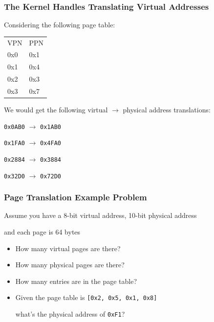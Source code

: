   \begin{frame}
    \frametitle{The Kernel Handles Translating Virtual Addresses}

    Considering the following page table:

    \begin{center}
    {\ttfamily
    \begin{tabular}{ll}
      VPN  & PPN  \\
      0x0 & 0x1 \\
      0x1 & 0x4 \\
      0x2 & 0x3 \\
      0x3 & 0x7 \\
    \end{tabular}}
    \end{center}

    We would get the following virtual $\rightarrow$ physical address translations:

    \begin{center}
    \texttt{0x0AB0} $\rightarrow$ \texttt{0x1AB0}
    
    \texttt{0x1FA0} $\rightarrow$ \texttt{0x4FA0}

    \texttt{0x2884} $\rightarrow$ \texttt{0x3884}

    \texttt{0x32D0} $\rightarrow$ \texttt{0x72D0}
    \end{center}
  \end{frame}

  \begin{frame}
    \frametitle{Page Translation Example Problem}

    Assume you have a 8-bit virtual address, 10-bit physical address

    \hspace{2em} and each page is 64 bytes

    \begin{itemize}
      \item How many virtual pages are there? 
      \item How many physical pages are there? 
      \item How many entries are in the page table? 
      \item Given the page table is \texttt{{[0x2, 0x5, 0x1, 0x8]}}

            \hspace{2em} what's the physical address of \texttt{0xF1}?

    \end{itemize}
  \end{frame}

